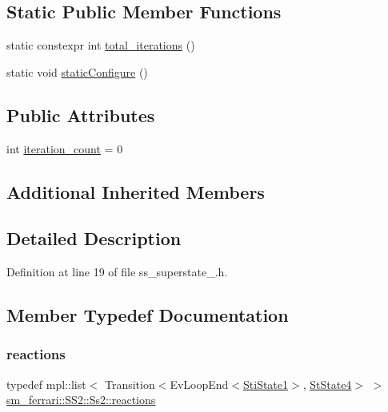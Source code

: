 \subsection*{Static Public Member Functions}
\begin{DoxyCompactItemize}
\item 
static constexpr int \hyperlink{structsm__ferrari_1_1SS2_1_1Ss2_ad33ee99bf902dc7939953cb3d8bc6a9d}{total\+\_\+iterations} ()
\item 
static void \hyperlink{structsm__ferrari_1_1SS2_1_1Ss2_aafdb81e13f3c8245992d734bd21eb813}{static\+Configure} ()
\end{DoxyCompactItemize}
\subsection*{Public Attributes}
\begin{DoxyCompactItemize}
\item 
int \hyperlink{structsm__ferrari_1_1SS2_1_1Ss2_a7b04c19b3a2be3ad9fdcaee06682bd33}{iteration\+\_\+count} = 0
\end{DoxyCompactItemize}
\subsection*{Additional Inherited Members}


\subsection{Detailed Description}


Definition at line 19 of file ss\+\_\+superstate\+\_.\+h.



\subsection{Member Typedef Documentation}
\mbox{\label{structsm__ferrari_1_1SS2_1_1Ss2_a8a6bc434259cb67fe2aa8fe7c510f260}} 
\subsubsection{\texorpdfstring{reactions}{reactions}}
{\footnotesize\ttfamily typedef mpl\+::list$<$ Transition$<$Ev\+Loop\+End$<$\hyperlink{structsm__ferrari_1_1inner__states_1_1StiState1}{Sti\+State1}$>$, \hyperlink{structsm__ferrari_1_1StState4}{St\+State4}$>$ $>$ \hyperlink{structsm__ferrari_1_1SS2_1_1Ss2_a8a6bc434259cb67fe2aa8fe7c510f260}{sm\+\_\+ferrari\+::\+S\+S2\+::\+Ss2\+::reactions}}



